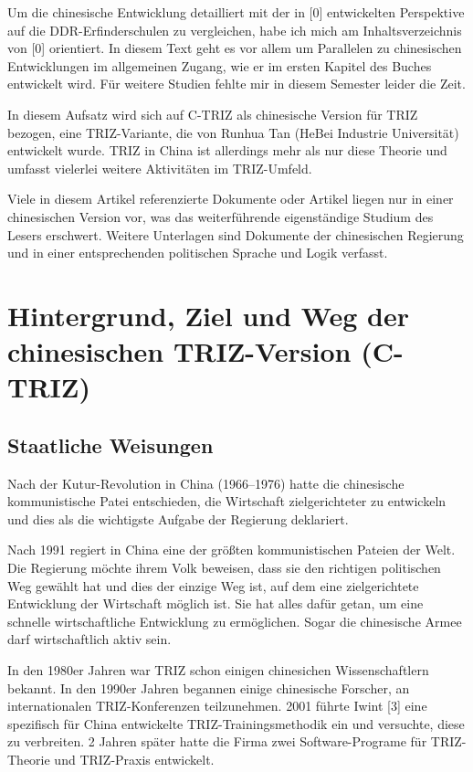 \documentclass[11pt,a4paper]{article}
\begin{document}
Um die chinesische Entwicklung detailliert mit der in [0] entwickelten
Perspektive auf die DDR-Erfinderschulen zu vergleichen, habe ich mich am
Inhaltsverzeichnis von [0] orientiert.  In diesem Text geht es vor allem um
Parallelen zu chinesischen Entwicklungen im allgemeinen Zugang, wie er im
ersten Kapitel des Buches entwickelt wird.  Für weitere Studien fehlte mir
in diesem Semester leider die Zeit.

In diesem Aufsatz wird sich auf C-TRIZ als chinesische Version für TRIZ
bezogen, eine TRIZ-Variante, die von Runhua Tan (HeBei Industrie Universität)
entwickelt wurde. TRIZ in China ist allerdings mehr als nur diese Theorie und
umfasst vielerlei weitere Aktivitäten im TRIZ-Umfeld. 

Viele in diesem Artikel referenzierte Dokumente oder Artikel liegen nur in
einer chinesischen Version vor, was das weiterführende eigenständige Studium
des Lesers erschwert. Weitere Unterlagen sind Dokumente der chinesischen
Regierung und in einer entsprechenden politischen Sprache und Logik verfasst.

\section{Hintergrund, Ziel und Weg der chinesischen TRIZ-Version (C-TRIZ)}

\subsection{Staatliche Weisungen}
Nach der Kutur-Revolution in China (1966--1976) hatte die chinesische
kommunistische Patei entschieden, die Wirtschaft zielgerichteter zu entwickeln
und dies als die wichtigste Aufgabe der Regierung deklariert.

Nach 1991 regiert in China eine der größten kommunistischen Pateien der Welt.
Die Regierung möchte ihrem Volk beweisen, dass sie den richtigen politischen
Weg gewählt hat und dies der einzige Weg ist, auf dem eine zielgerichtete
Entwicklung der Wirtschaft möglich ist. Sie hat alles dafür getan, um eine
schnelle wirtschaftliche Entwicklung zu ermöglichen. Sogar die chinesische
Armee darf wirtschaftlich aktiv sein.

In den 1980er Jahren war TRIZ schon einigen chinesichen Wissenschaftlern
bekannt.  In den 1990er Jahren begannen einige chinesische Forscher, an
internationalen TRIZ-Konferenzen teilzunehmen. 2001 führte Iwint [3] eine
spezifisch für China entwickelte TRIZ-Trainingsmethodik ein und versuchte,
diese zu verbreiten. 2 Jahren später hatte die Firma zwei Software-Programe
für TRIZ-Theorie und TRIZ-Praxis entwickelt.
\end{document}
